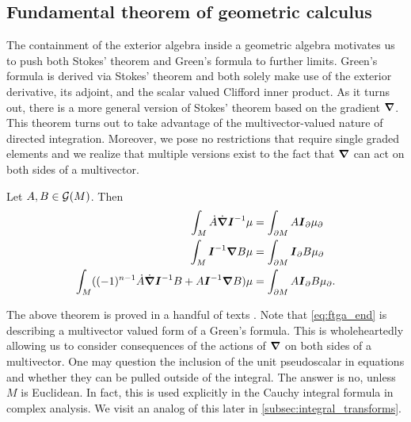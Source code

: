 \subsection{Fundamental theorem of geometric calculus}

The containment of the exterior algebra inside a geometric algebra motivates us to push both Stokes' theorem and Green's formula to further limits. Green's formula is derived via Stokes' theorem and both solely make use of the exterior derivative, its adjoint, and the scalar valued Clifford inner product. As it turns out, there is a more general version of Stokes' theorem based on the gradient $\boldsymbol{\nabla}$. This theorem turns out to take advantage of the multivector-valued nature of directed integration. Moreover, we pose no restrictions that require single graded elements and we realize that multiple versions exist to the fact that $\boldsymbol{\nabla}$ can act on both sides of a multivector.

\begin{theorem}
Let $A,B\in \mathcal{G}(M)$. Then
\begin{align}
\label{eq:ftga_start}
\int_M \dot{A}\dot{\boldsymbol{\nabla}} \boldsymbol{I}^{-1} \mu &= \int_{\partial M}  A \boldsymbol{I}_\partial \mu_\partial\\
\int_M  \boldsymbol{I}^{-1} \boldsymbol{\nabla} B \mu &= \int_{\partial M} \boldsymbol{I}_\partial B \mu_\partial\\
\int_M ((-1)^{n-1} \dot{A}\dot{\boldsymbol{\nabla}} \boldsymbol{I}^{-1} B + A \boldsymbol{I}^{-1} \boldsymbol{\nabla} B)\mu &= \int_{\partial M} A \boldsymbol{I}_\partial B \mu_\partial.
\label{eq:ftga_end}
\end{align}
\end{theorem}
The above theorem is proved in a handful of texts . Note that \cref{eq:ftga_end} is describing a multivector valued form of a Green's formula. This is wholeheartedly allowing us to consider consequences of the actions of $\boldsymbol{\nabla}$ on both sides of a multivector. One may question the inclusion of the unit pseudoscalar in equations  and whether they can be pulled outside of the integral. The answer is no, unless $M$ is Euclidean. In fact, this is used explicitly in the Cauchy integral formula in complex analysis. We visit an analog of this later in \cref{subsec:integral_transforms}. 

